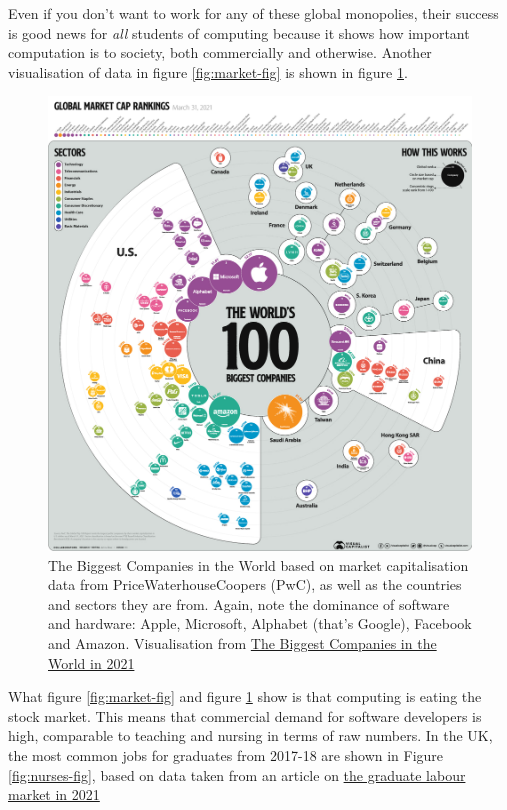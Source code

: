 \documentclass[
]{book}
\begin{document}
Even if you don't want to work for any of these global monopolies, their success is good news for \emph{all} students of computing because it shows how important computation is to society, both commercially and otherwise. Another visualisation of data in figure \ref{fig:market-fig} is shown in figure \ref{fig:market-again-fig}.

\begin{figure}

{\centering \includegraphics[width=1\linewidth]{images/Biggest-Companies-in-the-World} 

}

\caption{The Biggest Companies in the World based on market capitalisation data from PriceWaterhouseCoopers (PwC), as well as the countries and sectors they are from. Again, note the dominance of software and hardware: Apple, Microsoft, Alphabet (that's Google), Facebook and Amazon. Visualisation from \href{https://www.visualcapitalist.com/the-biggest-companies-in-the-world-in-2021/}{The Biggest Companies in the World in 2021} \citep{visualcap}}\label{fig:market-again-fig}
\end{figure}



What figure \ref{fig:market-fig} and figure \ref{fig:market-again-fig} show is that computing is eating the stock market. This means that commercial demand for software developers is high, comparable to teaching and nursing in terms of raw numbers. In the UK, the most common jobs for graduates from 2017-18 are shown in Figure \ref{fig:nurses-fig}, based on data taken from an article on \href{https://wonkhe.com/blogs/what-might-the-graduate-labour-market-look-like-in-2021/}{the graduate labour market in 2021} \citep{wonkyball}
\end{document}
